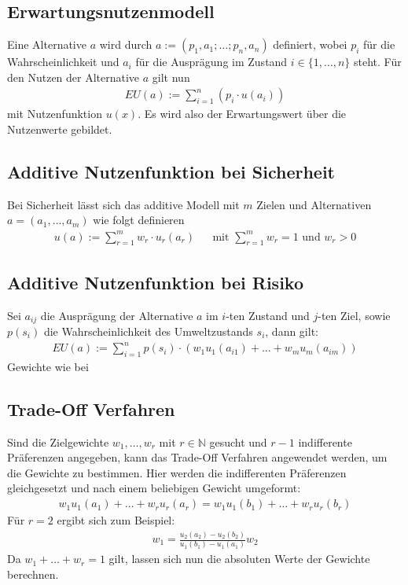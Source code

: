 \documentclass{panikzettel}
\begin{document}
\subsection{Erwartungsnutzenmodell}
Eine Alternative $ a $ wird durch $ a := (p_1, a_1; \dots; p_n, a_n) $ definiert, wobei $ p_i $ für die Wahrscheinlichkeit und $ a_i $ für die Ausprägung im Zustand $ i\in\{1, \dots, n\}$ steht. Für den Nutzen der Alternative $ a $ gilt nun
\begin{align*}
	EU(a) := \sum_{i=1}^{n} (p_i \cdot u(a_i))
\end{align*}
mit Nutzenfunktion $ u(x) $. Es wird also der Erwartungswert über die Nutzenwerte gebildet.

\subsection{Additive Nutzenfunktion bei Sicherheit}\label{sec:addUtility}
Bei Sicherheit lässt sich das additive Modell mit $ m $ Zielen und Alternativen $ a = (a_1, \dots, a_m) $ wie folgt definieren
\begin{align*}
	u(a) := \sum_{r=1}^{m} w_r\cdot u_r(a_r) && \text{mit } \sum_{r=1}^{m} w_r = 1 \text{ und } w_r > 0
\end{align*}

\subsection{Additive Nutzenfunktion bei Risiko}
Sei $ a_{ij} $ die Ausprägung der Alternative $ a $ im $ i $-ten Zustand und $ j $-ten Ziel, sowie $ p(s_i) $ die Wahrscheinlichkeit des Umweltzustands $ s_i $, dann gilt:
\begin{align*}
	EU(a) := \sum_{i=1}^{n} p(s_i) \cdot (w_1u_1(a_{i1}) + \dots + w_mu_m(a_{im}))
\end{align*}
Gewichte wie bei 

\subsection{Trade-Off Verfahren}
Sind die Zielgewichte $ w_1, \dots, w_r $ mit $ r\in\mathbb{N} $ gesucht und $ r-1 $ indifferente Präferenzen angegeben, kann das Trade-Off Verfahren angewendet werden, um die Gewichte zu bestimmen. Hier werden die indifferenten Präferenzen gleichgesetzt und nach einem beliebigen Gewicht umgeformt:
\begin{align*}
	w_1u_1(a_1) + \dots + w_ru_r(a_r) = w_1u_1(b_1) + \dots + w_ru_r(b_r)
\end{align*}
Für $ r=2 $ ergibt sich zum Beispiel:
\begin{align*}
	w_1 = \frac{u_2(a_2) - u_2(b_2)}{u_1(b_1) - u_1(a_1)} w_2
\end{align*}
Da $ w_1 + \dots + w_r = 1 $ gilt, lassen sich nun die absoluten Werte der Gewichte berechnen.
\end{document}
